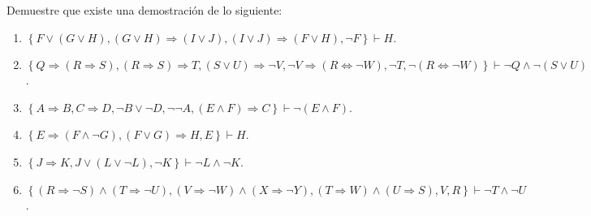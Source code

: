 \documentclass[12pt]{report}
\newcounter{it}
\theoremstyle{largebreak}
\begin{document}
    \begin{excer}
        Demuestre que existe una demostración de lo siguiente:
        \begin{enumerate}
            \item $\left\{F\lor(G\lor H),(G\lor H)\Rightarrow(I\lor J),(I\lor J)\Rightarrow(F\lor H),\neg F \right\}\vdash H$.
            \item $\left\{Q\Rightarrow(R\Rightarrow S), (R\Rightarrow S)\Rightarrow T, (S\lor U)\Rightarrow \neg V,\neg V\Rightarrow(R\iff \neg W),\neg T,\neg(R\iff \neg W) \right\}\vdash \neg Q\land\neg(S\lor U)$.
            \item $\left\{A\Rightarrow B, C\Rightarrow D, \neg B\lor\neg D,\neg\neg A, (E\land F)\Rightarrow C \right\}\vdash \neg(E\land F)$.
            \item $\left\{E\Rightarrow (F\land \neg G),(F\lor G)\Rightarrow H, E \right\}\vdash H$.
            \item $\left\{J\Rightarrow K, J\lor(L\lor\neg L),\neg K \right\}\vdash\neg L\land \neg K$.
            \item $\left\{(R\Rightarrow\neg S)\land(T\Rightarrow\neg U),(V\Rightarrow\neg W)\land(X\Rightarrow\neg Y),(T\Rightarrow W)\land(U\Rightarrow S), V, R \right\}\vdash \neg T\land\neg U$.
        \end{enumerate}
    \end{excer}
\end{document}
